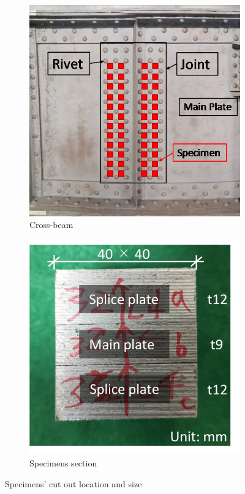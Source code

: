 \begin{figure}[htbp]
    \centering
    \begin{subfigure}[t]{0.48\textwidth}
    \includegraphics[width=\linewidth]{imgs/ch3/fig7a.png}
    \caption{Cross-beam}
    \label{ch3fig7a}  
    \end{subfigure}
    \hfill
    \begin{subfigure}[t]{0.48\textwidth}
    \includegraphics[width=\linewidth]{imgs/ch3/fig7b.png}
    \caption{Specimens section}
    \label{ch3fig7b}  
    \end{subfigure}
    \caption{Specimens' cut out location and size}
\end{figure}

